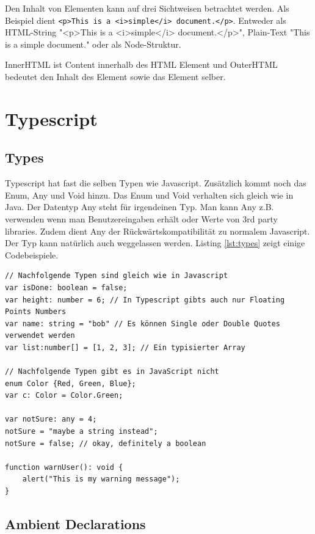 Den Inhalt von Elementen kann auf drei Sichtweisen betrachtet werden. Als Beispiel dient \lstinline|<p>This is a <i>simple</i> document.</p>|. Entweder als HTML-String "<p>This is a <i>simple</i> document.</p>", Plain-Text "This is a simple document." oder als Node-Struktur.

InnerHTML ist Content innerhalb des HTML Element und OuterHTML bedeutet den Inhalt des Element sowie das Element selber.

\section{Typescript}

\subsection{Types}

Typescript hat fast die selben Typen wie Javascript. Zusätzlich kommt noch das Enum, Any und Void hinzu. Das Enum und Void verhalten sich gleich wie in Java. Der Datentyp Any steht für irgendeinen Typ. Man kann Any z.B. verwenden wenn man Benutzereingaben erhält oder Werte von 3rd party libraries. Zudem dient Any der Rückwärtskompatibilität zu normalem Javascript. Der Typ kann natürlich auch weggelassen werden. Listing \ref{lst:types} zeigt einige Codebeispiele.

\begin{lstlisting}[label=lst:typescript-types,caption=Types]
// Nachfolgende Typen sind gleich wie in Javascript
var isDone: boolean = false;
var height: number = 6; // In Typescript gibts auch nur Floating Points Numbers
var name: string = "bob" // Es können Single oder Double Quotes verwendet werden
var list:number[] = [1, 2, 3]; // Ein typisierter Array

// Nachfolgende Typen gibt es in JavaScript nicht
enum Color {Red, Green, Blue};
var c: Color = Color.Green;

var notSure: any = 4;
notSure = "maybe a string instead";
notSure = false; // okay, definitely a boolean

function warnUser(): void {
	alert("This is my warning message");
}
\end{lstlisting}

\subsection{Ambient Declarations}

